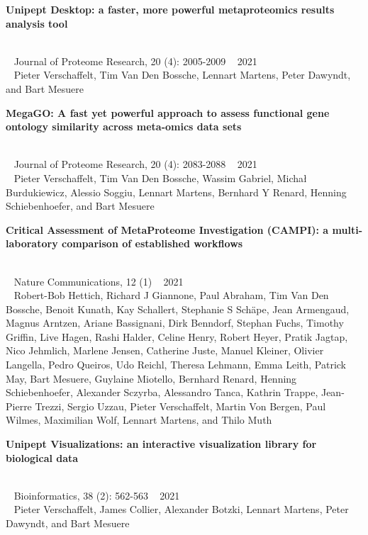 \begin{large}\textbf{\textsf{Unipept Desktop: a faster, more powerful metaproteomics results analysis tool}}\end{large} \\
\faBook ~ \textsf{Journal of Proteome Research, 20 (4): 2005-2009} \hfill \faCalendar ~ \textsf{2021} \\
{
    \myriad
    \faUser ~ \textsf{Pieter Verschaffelt}, Tim Van Den Bossche, Lennart Martens, Peter Dawyndt, and Bart Mesuere \\
}

\begin{large}\textbf{\textsf{MegaGO: A fast yet powerful approach to assess functional gene ontology similarity across meta-omics data sets}}\end{large} \\
\faBook ~ \textsf{Journal of Proteome Research, 20 (4): 2083-2088} \hfill \faCalendar ~ \textsf{2021} \\
{
    \myriad
    \faUser ~ \textsf{Pieter Verschaffelt}, Tim Van Den Bossche, Wassim Gabriel, Michał Burdukiewicz, Alessio Soggiu, Lennart Martens, Bernhard Y Renard, Henning Schiebenhoefer, and Bart Mesuere \\
}

\begin{large}\textbf{\textsf{Critical Assessment of MetaProteome Investigation (CAMPI): a multi-laboratory comparison of established workflows}}\end{large} \\
\faBook ~ \textsf{Nature Communications, 12 (1)} \hfill \faCalendar ~ \textsf{2021} \\
{
    \myriad
    \faUser ~ Robert-Bob Hettich, Richard J Giannone, Paul Abraham, Tim Van Den Bossche, Benoit Kunath, Kay Schallert, Stephanie S Schäpe, Jean Armengaud, Magnus Arntzen, Ariane Bassignani, Dirk Benndorf, Stephan Fuchs, Timothy Griffin, Live Hagen, Rashi Halder, Celine Henry, Robert Heyer, Pratik Jagtap, Nico Jehmlich, Marlene Jensen, Catherine Juste, Manuel Kleiner, Olivier Langella, Pedro Queiros, Udo Reichl, Theresa Lehmann, Emma Leith, Patrick May, Bart Mesuere, Guylaine Miotello, Bernhard Renard, Henning Schiebenhoefer, Alexander Sczyrba, Alessandro Tanca, Kathrin Trappe, Jean-Pierre Trezzi, Sergio Uzzau, \textsf{Pieter Verschaffelt}, Martin Von Bergen, Paul Wilmes, Maximilian Wolf, Lennart Martens, and Thilo Muth \\
}

\begin{large}\textbf{\textsf{Unipept Visualizations: an interactive visualization library for biological data}}\end{large} \\
\faBook ~ \textsf{Bioinformatics, 38 (2): 562-563} \hfill \faCalendar ~ \textsf{2021} \\
{
    \myriad
    \faUser ~ \textsf{Pieter Verschaffelt}, James Collier, Alexander Botzki, Lennart Martens, Peter Dawyndt, and Bart Mesuere \\
}

